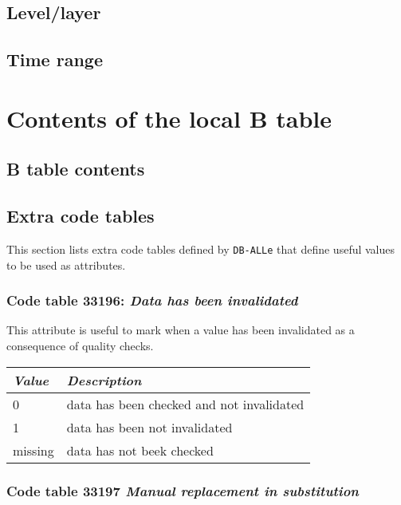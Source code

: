 \documentclass[final,12pt,a4paper,twoside]{book}
\newcommand{\dballe}{{\tt DB-ALLe}}
\begin{document}
\section{Level/layer}
\label{levels}



\section{Time range}
\label{tranges}



\chapter{Contents of the local B table}

\section{B table contents}

\label{btable}


\section{Extra code tables}
\label{extract}

This section lists extra code tables defined by \dballe{} that define useful
values to be used as attributes.

\subsection{Code table 33196: \emph{Data has been invalidated}}

This attribute is useful to mark when a value has been invalidated as a
consequence of quality checks.

\begin{tabular}{|l|l|}
\hline
{\em Value} & {\em Description}               \\
\hline
          0 & data has been checked and not invalidated  \\
          1 & data has been not invalidated              \\
    missing & data has not beek checked                  \\
\hline
\end{tabular}

\subsection{Code table 33197 \emph{Manual replacement in substitution}}
\end{document}
